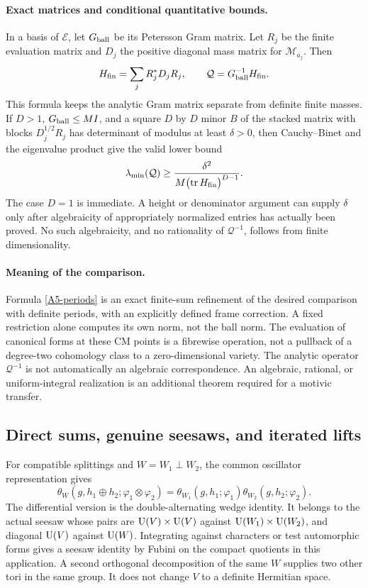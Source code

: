 \documentclass[11pt]{article}
\theoremstyle{definition}\newtheorem{definition}[theorem]{Definition}\newtheorem{remark}[theorem]{Remark}
\begin{document}
\paragraph{Exact matrices and conditional quantitative bounds.}
In a basis of $\mathcal E$, let $G_{\rm ball}$ be its Petersson Gram
matrix. Let $R_j$ be the finite evaluation matrix and $D_j$ the
positive diagonal mass matrix for $\mathcal M_{a_j}$. Then
\[
 H_{\rm fin}=\sum_jR_j^*D_jR_j,\qquad
                  \mathcal Q=G_{\rm ball}^{-1}H_{\rm fin}.
\]
This formula keeps the analytic Gram matrix separate from definite
finite masses. If $D>1$, $G_{\rm ball}\leq M I$, and a square
$D$ by $D$ minor $B$ of the stacked matrix with blocks
$D_j^{1/2}R_j$ has determinant of modulus at least $\delta>0$, then
Cauchy--Binet and the eigenvalue product give the valid lower bound
\[
 \lambda_{\min}(\mathcal Q)
 \geq\frac{\delta^2}{M\bigl(\operatorname{tr}H_{\rm fin}\bigr)^{D-1}}.
\]
The case $D=1$ is immediate. A height or denominator argument can
supply $\delta$ only after algebraicity of appropriately normalized
entries has actually been proved. No such algebraicity, and no
rationality of $\mathcal Q^{-1}$, follows from finite dimensionality.

\paragraph{Meaning of the comparison.}
Formula \eqref{A5-periods} is an exact finite-sum refinement of the
desired comparison with definite periods, with an explicitly defined
frame correction. A fixed restriction alone computes its own norm,
not the ball norm. The evaluation of canonical forms at these CM
points is a fibrewise operation, not a pullback of a degree-two
cohomology class to a zero-dimensional variety. The analytic operator
$\mathcal Q^{-1}$ is not automatically an algebraic correspondence.
An algebraic, rational, or uniform-integral realization is an
additional theorem required for a motivic transfer.

\subsection{Direct sums, genuine seesaws, and iterated lifts}

For compatible splittings and $W=W_1\perp W_2$, the common oscillator
representation gives
\[
 \theta_W(g,h_1\oplus h_2;\varphi_1\otimes\varphi_2)
 =\theta_{W_1}(g,h_1;\varphi_1)
             \theta_{W_2}(g,h_2;\varphi_2).
\]
The differential version is the double-alternating wedge identity.
It belongs to the actual seesaw whose pairs are
$\operatorname{U}(V)\times\operatorname{U}(V)$ against $\operatorname{U}(W_1)\times\operatorname{U}(W_2)$, and diagonal
$\operatorname{U}(V)$ against $\operatorname{U}(W)$. Integrating against characters or test
automorphic forms gives a seesaw identity by Fubini on the compact
quotients in this application. A second orthogonal decomposition of
the same $W$ supplies two other tori in the same group. It does not
change $V$ to a definite Hermitian space.
\end{document}
